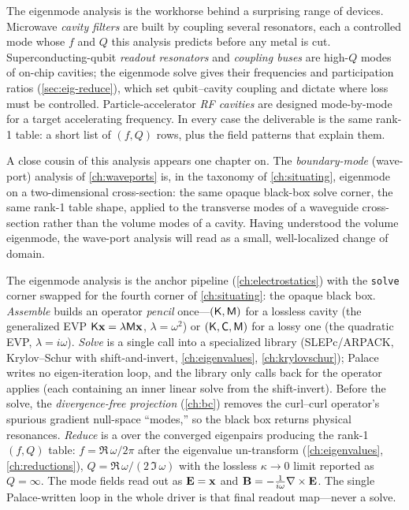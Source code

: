 \begin{remark}[Applications]
The eigenmode analysis is the workhorse behind a surprising range of devices.
Microwave \emph{cavity filters} are built by coupling several resonators, each a
controlled mode whose $f$ and $Q$ this analysis predicts before any metal is cut.
Superconducting-qubit \emph{readout resonators} and \emph{coupling buses} are
high-$Q$ modes of on-chip cavities; the eigenmode solve gives their frequencies
and participation ratios (\cref{sec:eig-reduce}), which set qubit--cavity
coupling and dictate where loss must be controlled. Particle-accelerator
\emph{RF cavities} are designed mode-by-mode for a target accelerating frequency.
In every case the deliverable is the same rank-1 table: a short list of
$(f,Q)$ rows, plus the field patterns that explain them.
\end{remark}

A close cousin of this analysis appears one chapter on. The \emph{boundary-mode}
(wave-port) analysis of \cref{ch:waveports} is, in the taxonomy of
\cref{ch:situating}, eigenmode on a two-dimensional cross-section: the same
opaque black-box solve corner, the same rank-1 table shape, applied to the
transverse modes of a waveguide cross-section rather than the volume modes of a
cavity. Having understood the volume eigenmode, the wave-port analysis will read
as a small, well-localized change of domain.

\summarysection
The eigenmode analysis is the anchor pipeline (\cref{ch:electrostatics}) with the
\texttt{solve} corner swapped for the fourth corner of \cref{ch:situating}: the
opaque black box. \emph{Assemble} builds an operator \emph{pencil} once---$(\mathsf{K},\mathsf{M})$
for a lossless cavity (the generalized EVP $\mathsf{K}\mathbf{x}=\lambda\mathsf{M}\mathbf{x}$,
$\lambda=\omega^2$) or $(\mathsf{K},\mathsf{C},\mathsf{M})$ for a lossy one (the quadratic EVP,
$\lambda=i\omega$). \emph{Solve} is a single  call into a
specialized library (SLEPc/ARPACK, Krylov--Schur with shift-and-invert,
\cref{ch:eigenvalues}, \cref{ch:krylovschur}); Palace writes no eigen-iteration
loop, and the library only calls back for the operator applies (each containing
an inner linear solve from the shift-invert). Before the solve, the
\emph{divergence-free projection} (\cref{ch:bc}) removes the curl--curl operator's
spurious gradient null-space ``modes,'' so the black box returns physical
resonances. \emph{Reduce} is a  over the converged eigenpairs producing
the rank-1 $(f,Q)$ table: $f=\Re\,\omega/2\pi$ after the eigenvalue un-transform
(\cref{ch:eigenvalues}, \cref{ch:reductions}), $Q=\Re\,\omega/(2\,\Im\,\omega)$
with the lossless $\kappa\to0$ limit reported as $Q=\infty$. The mode fields read
out as $\mathbf{E}=\mathbf{x}$ and $\mathbf{B}=-\tfrac{1}{i\omega}\nabla\times\mathbf{E}$. The single Palace-written
loop in the whole driver is that final readout map---never a solve.

